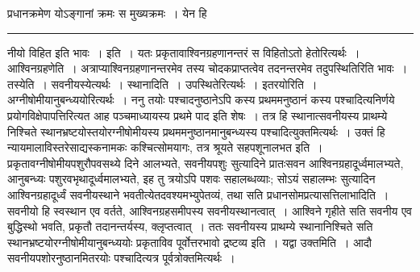 \documentclass[11pt, openany]{book}
\begin{document}
{\bl प्रधानक्रमेण योऽङ्गानां क्रमः स मुख्यक्रमः~। येन हि}\\
\hrule
\vspace{3mm}
\noindent
नीयो विहित इति भावः~। {\br इति~।} यतः प्रकृतावाश्विनग्रहणानन्तरं स विहितोऽतो हेतोरित्यर्थः~। {\br आश्विनग्रहणेति~।} अत्राप्याश्विनग्रहणानन्तरमेव तस्य चोदकप्राप्तत्वेव तदनन्तरमेव तदुपस्थितिरिति भावः~। {\br तस्येति~।} सवनीयस्येत्यर्थः~। {\br स्थानादिति~।} उपस्थितेरित्यर्थः~। {\br इतरयोरिति~।} अग्नीषोमीयानुबन्ध्ययोरित्यर्थः~। {\br ननु} तयोः पश्चादनुष्ठानेऽपि कस्य प्रथममनुष्ठानं कस्य पश्चादित्यनिर्णये प्रयोगविक्षेपापत्तिरित्यत आह
पञ्चमाध्यायस्य प्रथमे पाद इति शेषः~। तत्र हि स्थानात्सवनीयस्य प्राथम्ये निश्चिते स्थानभ्रष्टयोस्तयोरग्नीषोमीयस्य प्रथममनुष्ठानमानुबन्ध्यस्य पश्चादित्युक्तमित्यर्थः~। उक्तं हि {\br न्यायमालाविस्तरे}\textendash साद्यस्कनामकः कश्चित्सोमयागः, तत्र श्रूयते सहपशूनालभत इति~। प्रकृतावग्नीषोमीयपशुरौपवसथ्ये दिने आलभ्यते, सवनीयपशुः सुत्यादिने
प्रातःसवन आश्विनग्रहादूर्ध्वमालभ्यते, आनुबन्ध्यः पशुरवभृथादूर्ध्वमालभ्यते, इह तु त्रयोऽपि पशवः सहालब्धव्याः; सोऽयं सहालम्भः सुत्यादिन आश्विनग्रहादूर्ध्वं सवनीयस्थाने
भवतीत्येतदवश्यमभ्युपेतव्यं, तथा सति प्रधानसोमप्रत्यासत्तिलाभादिति~। सवनीयो हि स्वस्थान एव वर्तते, आश्विनग्रहसमीपस्य सवनीयस्थानत्वात्~। आश्विने गृहीते सति सवनीय एव बुद्धिस्थो भवति, प्रकृतौ तदानन्तर्यस्य, क्लृप्तत्वात्~। ततः सवनीयस्य प्राथम्ये स्थानानिश्चिते सति स्थानभ्रष्टयोरग्नीषोमीयानुबन्ध्ययोः प्रकृताविव पूर्वोत्तरभावो द्रष्टव्य
इति~। यद्वा {\br उक्तमिति~।} आदौ सवनीयपशोरनुष्ठानमितरयोः पश्चादित्यत्र पूर्वत्रोक्तमित्यर्थः~।\\
\end{document}
